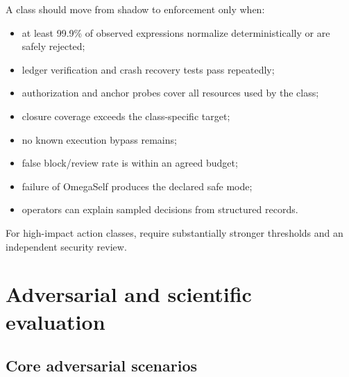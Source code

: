 \documentclass[11pt,oneside]{report}
\begin{document}
A class should move from shadow to enforcement only when:

\begin{itemize}
  \item at least 99.9\% of observed expressions normalize deterministically or are safely rejected;
  \item ledger verification and crash recovery tests pass repeatedly;
  \item authorization and anchor probes cover all resources used by the class;
  \item closure coverage exceeds the class-specific target;
  \item no known execution bypass remains;
  \item false block/review rate is within an agreed budget;
  \item failure of OmegaSelf produces the declared safe mode;
  \item operators can explain sampled decisions from structured records.
\end{itemize}

For high-impact action classes, require substantially stronger thresholds and an independent security review.

\chapter{Adversarial and scientific evaluation}

\section{Core adversarial scenarios}
\end{document}
